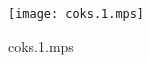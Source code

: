 \documentclass[letterpaper,10pt]{article}
\begin{document}
\begin{figure}
    \centering
    \texttt{[image: coks.1.mps]}
    \caption{coks.1.mps}
\end{figure}
\end{document}
